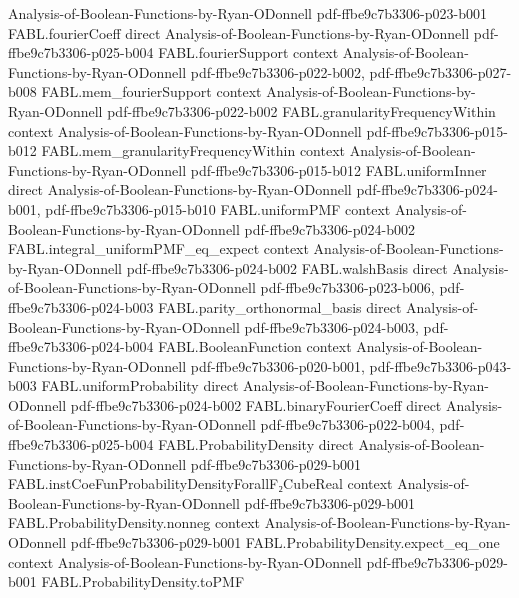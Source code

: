 \begin{theorem}
  {Analysis-of-Boolean-Functions-by-Ryan-ODonnell}
  {pdf-ffbe9c7b3306-p023-b001}
\proofstep
  {FABL.fourierCoeff}
  {direct}
  {Analysis-of-Boolean-Functions-by-Ryan-ODonnell}
  {pdf-ffbe9c7b3306-p025-b004}
\proofstep
  {FABL.fourierSupport}
  {context}
  {Analysis-of-Boolean-Functions-by-Ryan-ODonnell}
  {pdf-ffbe9c7b3306-p022-b002,
    pdf-ffbe9c7b3306-p027-b008}
\proofstep
  {FABL.mem_fourierSupport}
  {context}
  {Analysis-of-Boolean-Functions-by-Ryan-ODonnell}
  {pdf-ffbe9c7b3306-p022-b002}
\proofstep
  {FABL.granularityFrequencyWithin}
  {context}
  {Analysis-of-Boolean-Functions-by-Ryan-ODonnell}
  {pdf-ffbe9c7b3306-p015-b012}
\proofstep
  {FABL.mem_granularityFrequencyWithin}
  {context}
  {Analysis-of-Boolean-Functions-by-Ryan-ODonnell}
  {pdf-ffbe9c7b3306-p015-b012}
\proofstep
  {FABL.uniformInner}
  {direct}
  {Analysis-of-Boolean-Functions-by-Ryan-ODonnell}
  {pdf-ffbe9c7b3306-p024-b001,
    pdf-ffbe9c7b3306-p015-b010}
\proofstep
  {FABL.uniformPMF}
  {context}
  {Analysis-of-Boolean-Functions-by-Ryan-ODonnell}
  {pdf-ffbe9c7b3306-p024-b002}
\proofstep
  {FABL.integral_uniformPMF_eq_expect}
  {context}
  {Analysis-of-Boolean-Functions-by-Ryan-ODonnell}
  {pdf-ffbe9c7b3306-p024-b002}
\proofstep
  {FABL.walshBasis}
  {direct}
  {Analysis-of-Boolean-Functions-by-Ryan-ODonnell}
  {pdf-ffbe9c7b3306-p023-b006,
    pdf-ffbe9c7b3306-p024-b003}
\proofstep
  {FABL.parity_orthonormal_basis}
  {direct}
  {Analysis-of-Boolean-Functions-by-Ryan-ODonnell}
  {pdf-ffbe9c7b3306-p024-b003,
    pdf-ffbe9c7b3306-p024-b004}
\proofstep
  {FABL.BooleanFunction}
  {context}
  {Analysis-of-Boolean-Functions-by-Ryan-ODonnell}
  {pdf-ffbe9c7b3306-p020-b001,
    pdf-ffbe9c7b3306-p043-b003}
\proofstep
  {FABL.uniformProbability}
  {direct}
  {Analysis-of-Boolean-Functions-by-Ryan-ODonnell}
  {pdf-ffbe9c7b3306-p024-b002}
\proofstep
  {FABL.binaryFourierCoeff}
  {direct}
  {Analysis-of-Boolean-Functions-by-Ryan-ODonnell}
  {pdf-ffbe9c7b3306-p022-b004,
    pdf-ffbe9c7b3306-p025-b004}
\proofstep
  {FABL.ProbabilityDensity}
  {direct}
  {Analysis-of-Boolean-Functions-by-Ryan-ODonnell}
  {pdf-ffbe9c7b3306-p029-b001}
\proofstep
  {FABL.instCoeFunProbabilityDensityForallF₂CubeReal}
  {context}
  {Analysis-of-Boolean-Functions-by-Ryan-ODonnell}
  {pdf-ffbe9c7b3306-p029-b001}
\proofstep
  {FABL.ProbabilityDensity.nonneg}
  {context}
  {Analysis-of-Boolean-Functions-by-Ryan-ODonnell}
  {pdf-ffbe9c7b3306-p029-b001}
\proofstep
  {FABL.ProbabilityDensity.expect_eq_one}
  {context}
  {Analysis-of-Boolean-Functions-by-Ryan-ODonnell}
  {pdf-ffbe9c7b3306-p029-b001}
\proofstep
  {FABL.ProbabilityDensity.toPMF}

\end{theorem}
